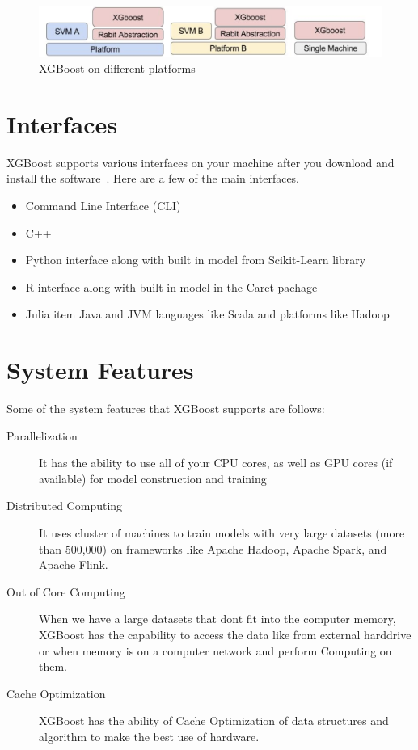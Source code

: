 \begin{figure}[!ht]
        \centering\includegraphics[width=\columnwidth]
        {images/XGBoost-on-different-platforms.png}
        \caption{XGBoost on different platforms}\label{s:XGBoost-on-different-platforms}
\end{figure}

\section{Interfaces}

XGBoost supports various interfaces on your machine after you download and
install the software~\cite{hid-sp18-401-XGBoost-MLmastery}. Here are a few 
of the main interfaces.

\begin{itemize}
\item Command Line Interface (CLI)  
\item C++  
\item Python interface along with built in model from Scikit-Learn library   
\item R interface along with built in model in the Caret pachage  
\item Julia item Java and JVM languages like Scala and platforms like Hadoop
\end{itemize}



\section{System Features} 

Some of the system features that XGBoost supports are follows: 

\begin{description}
\item[Parallelization]

It has the ability to use all of your CPU cores, as well as GPU cores (if
available) for model construction and training

\item[Distributed Computing]

It uses cluster of machines to train models with very large datasets (more than
500,000) on frameworks like Apache Hadoop, Apache Spark, and Apache Flink.

\item[Out of Core Computing]

When we have a large datasets that dont fit into the computer memory, XGBoost
has the capability to access the data  like from external harddrive or when
memory is on a computer network and perform Computing on them.

\item[Cache Optimization]

XGBoost has the ability of Cache Optimization of data structures and algorithm
to make the best use of hardware.

\end{description}


